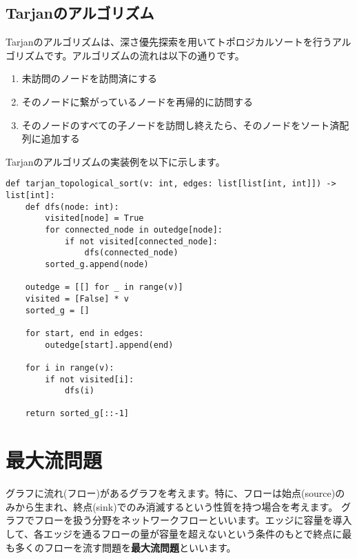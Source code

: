 \documentclass{jlreq}
\begin{document}
\subsection{Tarjanのアルゴリズム}
Tarjanのアルゴリズムは、深さ優先探索を用いてトポロジカルソートを行うアルゴリズムです。アルゴリズムの流れは以下の通りです。

\begin{enumerate}
  \item 未訪問のノードを訪問済にする
  \item そのノードに繋がっているノードを再帰的に訪問する
  \item そのノードのすべての子ノードを訪問し終えたら、そのノードをソート済配列に追加する
\end{enumerate}

Tarjanのアルゴリズムの実装例を以下に示します。

\begin{lstlisting}[caption=Tarjanのアルゴリズムの実装, label=tarjan, frame=TRBL, label={tarjan}]
def tarjan_topological_sort(v: int, edges: list[list[int, int]]) -> list[int]:
    def dfs(node: int):
        visited[node] = True
        for connected_node in outedge[node]:
            if not visited[connected_node]:
                dfs(connected_node)
        sorted_g.append(node)
    
    outedge = [[] for _ in range(v)]
    visited = [False] * v
    sorted_g = []
    
    for start, end in edges:
        outedge[start].append(end)
    
    for i in range(v):
        if not visited[i]:
            dfs(i)
    
    return sorted_g[::-1]
\end{lstlisting}

\newpage

\section{最大流問題}
グラフに流れ(フロー)があるグラフを考えます。特に、フローは始点(source)のみから生まれ、終点(sink)でのみ消滅するという性質を持つ場合を考えます。
グラフでフローを扱う分野をネットワークフローといいます。エッジに容量を導入して、各エッジを通るフローの量が容量を超えないという条件のもとで終点に最も多くのフローを流す問題を\textbf{最大流問題}といいます。

\vspace{0.5cm}

\begin{center}
\end{center}
\end{document}
